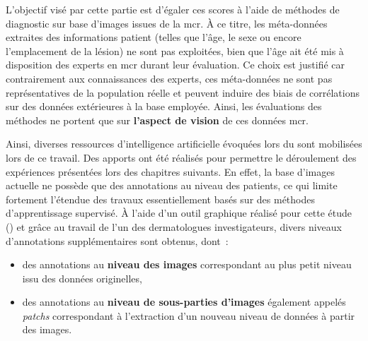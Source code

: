L'objectif visé par cette partie est d'égaler ces scores à l'aide de méthodes de diagnostic sur base d'images issues de la \gls{mcr}. À ce titre, les méta-données extraites des informations patient (telles que l'âge, le sexe ou encore l'emplacement de la lésion) ne sont pas exploitées, bien que l'âge ait été mis à disposition des experts en \gls{mcr} durant leur évaluation. Ce choix est justifié car contrairement aux connaissances des experts, ces méta-données ne sont pas représentatives de la population réelle et peuvent induire des biais de corrélations sur des données extérieures à la base employée. Ainsi, les évaluations des méthodes ne portent que sur \textbf{l'aspect de vision} de ces données \gls{mcr}.\par

Ainsi, diverses ressources d'intelligence artificielle évoquées lors du  sont mobilisées lors de ce travail. Des apports ont été réalisés pour permettre le déroulement des expériences présentées lors des chapitres suivants. En effet, la base d'images actuelle ne possède que des annotations au niveau des patients, ce qui limite fortement l'étendue des travaux essentiellement basés sur des méthodes d'apprentissage supervisé. À l'aide d'un outil graphique réalisé pour cette étude () et grâce au travail de l'un des dermatologues investigateurs, divers niveaux d'annotations supplémentaires sont obtenus, dont~:
\begin{itemize}
    \item des annotations au \textbf{niveau des images} correspondant au plus petit niveau issu des données originelles,
    \item des annotations au \textbf{niveau de sous-parties d'images} également appelés \textit{patchs} correspondant à l'extraction d'un nouveau niveau de données à partir des images.
\end{itemize}\par
\clearpage

